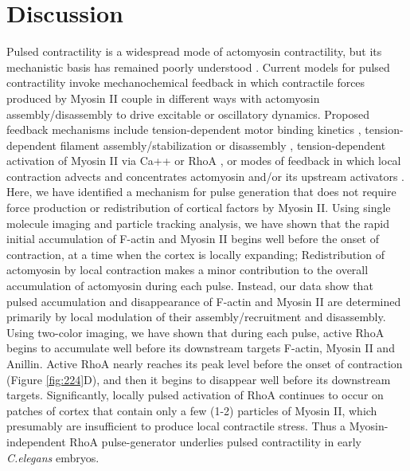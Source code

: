 \section{Discussion}
Pulsed contractility is a widespread mode of actomyosin contractility, but its mechanistic basis has remained poorly understood \cite{Levayer:2012bu, Gorfinkiel:2016bv}. Current models for pulsed contractility invoke mechanochemical feedback in which contractile forces produced by Myosin II couple in different ways with actomyosin assembly/disassembly to drive excitable or oscillatory dynamics. Proposed feedback mechanisms include tension-dependent motor binding kinetics \cite{Ren:2009ep, Effler:2006hc, He:2010gf, Luo:2012bl}, tension-dependent filament assembly/stabilization \cite{Hayakawa:2011dq, DeLaCruz:2015dj} or disassembly \cite{Machado:2014fx}, tension-dependent activation of Myosin II via Ca++ \cite{Kapustina:2008ds} or RhoA \cite{Koride:2014hp}, or modes of feedback in which local contraction advects and concentrates actomyosin and/or its upstream activators \cite{Bois:2011kx, Kumar:2014ux, Munjal:2015bx}.  Here, we have identified a mechanism for pulse generation that does not require force production or redistribution of cortical factors by Myosin II.  Using single molecule imaging and particle tracking analysis, we have shown that the rapid initial accumulation of F-actin and Myosin II begins well before the onset of contraction, at a time when the cortex is locally expanding; Redistribution of actomyosin by local contraction makes a minor contribution to the overall accumulation of actomyosin during each pulse.  Instead, our data show that pulsed accumulation and disappearance of F-actin and Myosin II are determined primarily by local modulation of their assembly/recruitment and disassembly. Using two-color imaging, we have shown that during each pulse, active RhoA begins to accumulate well before its downstream targets F-actin, Myosin II and Anillin. Active RhoA nearly reaches its peak level before the onset of contraction (Figure \ref{fig:224}D), and then it begins to disappear well before its downstream targets. Significantly, locally pulsed activation of RhoA continues to occur on patches of cortex that contain only a few (1-2) particles of Myosin II, which presumably are insufficient to produce local contractile stress. Thus a Myosin-independent RhoA pulse-generator underlies pulsed contractility in early \textit{C.elegans} embryos.

